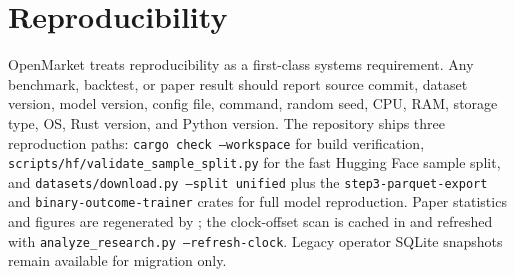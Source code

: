 \FloatBarrier
\section{Reproducibility}
\label{sec:reproducibility}

OpenMarket treats reproducibility as a first-class systems requirement. Any
benchmark, backtest, or paper result should report source commit, dataset
version, model version, config file, command, random seed, CPU, RAM, storage
type, OS, Rust version, and Python version. The repository ships three
reproduction paths: \texttt{cargo check --workspace} for build verification,
\texttt{scripts/hf/validate\_sample\_split.py} for the fast Hugging Face sample
split, and \texttt{datasets/download.py --split unified} plus the
\texttt{step3-parquet-export} and \texttt{binary-outcome-trainer} crates for
full model reproduction. Paper statistics and figures are regenerated by
; the clock-offset scan is cached in
 and refreshed with
\texttt{analyze\_research.py --refresh-clock}. Legacy operator SQLite snapshots
remain available for migration only.
